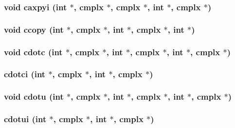 \subsubsection{\setlength{\rightskip}{0pt plus 5cm}void caxpyi (int $\ast$, {\bf cmplx} $\ast$, {\bf cmplx} $\ast$, int $\ast$, {\bf cmplx} $\ast$)}\label{essl_8h_1348c11125d438a2ae8c8873052e8513}


\subsubsection{\setlength{\rightskip}{0pt plus 5cm}void ccopy (int $\ast$, {\bf cmplx} $\ast$, int $\ast$, {\bf cmplx} $\ast$, int $\ast$)}\label{essl_8h_0cf74529a55fbd120f919d939640e165}


\subsubsection{\setlength{\rightskip}{0pt plus 5cm}void cdotc (int $\ast$, {\bf cmplx} $\ast$, int $\ast$, {\bf cmplx} $\ast$, int $\ast$, {\bf cmplx} $\ast$)}\label{essl_8h_bf94315e2662023835fc8e96d6c24be2}


\subsubsection{ cdotci (int $\ast$, {\bf cmplx} $\ast$, int $\ast$, {\bf cmplx} $\ast$)}\label{essl_8h_ef63b243cd32e6aefaff7505b955c1a8}


\subsubsection{\setlength{\rightskip}{0pt plus 5cm}void cdotu (int $\ast$, {\bf cmplx} $\ast$, int $\ast$, {\bf cmplx} $\ast$, int $\ast$, {\bf cmplx} $\ast$)}\label{essl_8h_3306ed65ed54f414a49c209987b28b46}


\subsubsection{ cdotui (int $\ast$, {\bf cmplx} $\ast$, int $\ast$, {\bf cmplx} $\ast$)}\label{essl_8h_b583500735a98812e6d1dae7a0770b26}


